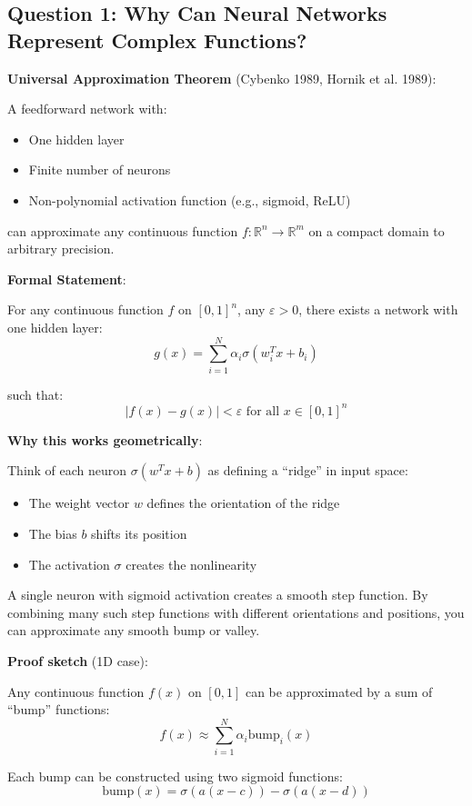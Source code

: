 \subsection{Question 1: Why Can Neural Networks Represent Complex Functions?}

\textbf{Universal Approximation Theorem} (Cybenko 1989, Hornik et al. 1989):

A feedforward network with:
\begin{itemize}
\item One hidden layer
\item Finite number of neurons
\item Non-polynomial activation function (e.g., sigmoid, ReLU)
\end{itemize}

can approximate any continuous function $f: \mathbb{R}^n \to \mathbb{R}^m$ on a compact domain to arbitrary precision.

\textbf{Formal Statement}:

For any continuous function $f$ on $[0,1]^n$, any $\varepsilon > 0$, there exists a network with one hidden layer:
\[
g(x) = \sum_{i=1}^N \alpha_i \sigma(w_i^T x + b_i)
\]

such that:
\[
|f(x) - g(x)| < \varepsilon  \text{ for all } x \in [0,1]^n
\]

\textbf{Why this works geometrically}:

Think of each neuron $\sigma(w^T x + b)$ as defining a ``ridge'' in input space:
\begin{itemize}
\item The weight vector $w$ defines the orientation of the ridge
\item The bias $b$ shifts its position
\item The activation $\sigma$ creates the nonlinearity
\end{itemize}

A single neuron with sigmoid activation creates a smooth step function. By combining many such step functions with different orientations and positions, you can approximate any smooth bump or valley.

\textbf{Proof sketch} (1D case):

Any continuous function $f(x)$ on $[0,1]$ can be approximated by a sum of ``bump'' functions:
\[
f(x) \approx \sum_{i=1}^N \alpha_i \text{bump}_i(x)
\]

Each bump can be constructed using two sigmoid functions:
\[
\text{bump}(x) = \sigma(a(x - c)) - \sigma(a(x - d))
\]


